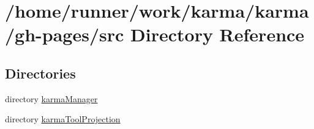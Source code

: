 \section{/home/runner/work/karma/karma/gh-\/pages/src Directory Reference}
\label{dir_68267d1309a1af8e8297ef4c3efbcdba}
\subsection*{Directories}
\begin{DoxyCompactItemize}
\item 
directory \hyperlink{dir_d5fc9e74ecd446ba07279cb903928e76}{karma\+Manager}
\item 
directory \hyperlink{dir_41f00478989b00c299e09b5f630aa3f5}{karma\+Tool\+Projection}
\end{DoxyCompactItemize}
